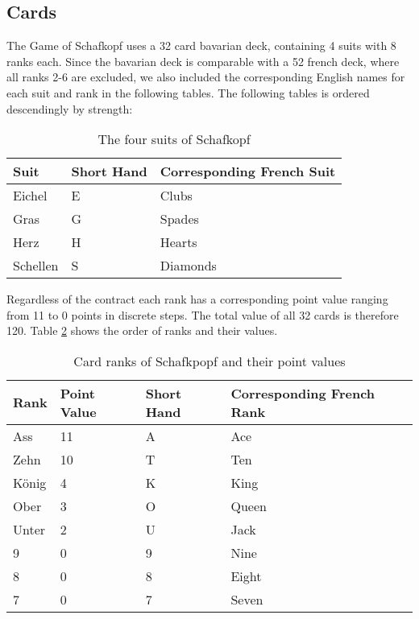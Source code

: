\subsection{Cards}\label{sec:cards}
The Game of Schafkopf uses a 32 card bavarian deck, containing 4 suits with 8 ranks each.
Since the bavarian deck is comparable with a 52 french deck, where all ranks 2-6 are excluded, we also included the
corresponding English names for each suit and rank in the following tables.
The following tables is ordered descendingly by strength:
\newline
\begin{table}[h!]
    \centering
    \begin{tabular}{lll}
        \toprule
        Suit     & Short Hand & Corresponding French Suit \\
        \midrule
        Eichel   & E          & Clubs                     \\
        Gras     & G          & Spades                    \\
        Herz     & H          & Hearts                    \\
        Schellen & S          & Diamonds                  \\
        \bottomrule
    \end{tabular}
    \caption{The four suits of Schafkopf}
    \label{tab:suits}
\end{table}
\newline
Regardless of the contract each rank has a corresponding point value ranging from 11 to 0 points in discrete steps.
The total value of all 32 cards is therefore 120.
\newline
Table \ref{tab:cardsvalues} shows the order of ranks and their values.
\newline
\begin{table}[h!]
    \centering
    \begin{tabular}{llll}
        \toprule
        Rank  & Point Value & Short Hand & Corresponding French Rank \\
        \midrule
        Ass   & 11          & A          & Ace                       \\
        Zehn  & 10          & T          & Ten                       \\
        König & 4           & K          & King                      \\
        Ober  & 3           & O          & Queen                     \\
        Unter & 2           & U          & Jack                      \\
        9     & 0           & 9          & Nine                      \\
        8     & 0           & 8          & Eight                     \\
        7     & 0           & 7          & Seven                     \\
        \bottomrule
    \end{tabular}
    \caption{Card ranks of Schafkpopf and their point values}
    \label{tab:cardsvalues}
\end{table}
